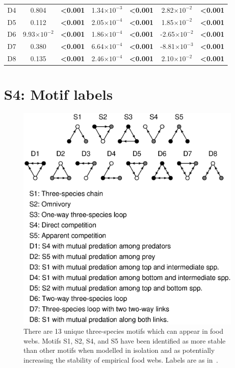 \documentclass[12pt]{article}
\begin{document}
\begin{table}[h!]
\begin{tabular}{l | c c c c c c }
        D4	&	0.804	&	\textbf{\textless0.001}	&	1.34$\times10^{-3}$	&	\textbf{\textless0.001}	&	2.82$\times10^{-2}$	&	\textbf{\textless0.001}	\\
        D5	&	0.112	&	\textbf{\textless0.001}	&	2.05$\times10^{-4}$	&	\textbf{\textless0.001}	&	1.85$\times10^{-2}$	&	\textbf{\textless0.001}	\\
        D6	&	9.93$\times10^{-2}$	&	\textbf{\textless0.001}	&	1.86$\times10^{-4}$	&	\textbf{\textless0.001}	&	-2.65$\times10^{-2}$	&	\textbf{\textless0.001}	\\
        D7	&	0.380	&	\textbf{\textless0.001}	&	6.64$\times10^{-4}$	&	\textbf{\textless0.001}	&	-8.81$\times10^{-3}$	&	\textbf{\textless0.001}	\\
        D8	&	0.135	&	\textbf{\textless0.001}	&	2.46$\times10^{-4}$	&	\textbf{\textless0.001}	&	2.10$\times10^{-2}$	&	\textbf{\textless0.001}	\\
        \hline
        \end{tabular}
        \end{table}
        

\clearpage

\section*{S4: Motif labels}

	\begin{figure}[h!]
		\caption{There are 13 unique three-species motifs which can appear in food webs. Motifs S1, S2, S4, and S5 have been identified as more stable than other motifs when modelled in isolation and as potentially increasing the stability of empirical food webs. Labels are as in~\citet{Stouffer2007}.}
		\label{motifs}
		\includegraphics[width=.8\textwidth]{figures/motifs.eps}
		\end{figure}


\clearpage

     
\end{document}
